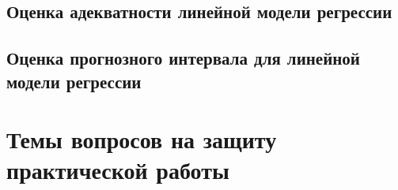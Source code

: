 \documentclass[
]{article}
\begin{document}
\hypertarget{ux43eux446ux435ux43dux43aux430-ux430ux434ux435ux43aux432ux430ux442ux43dux43eux441ux442ux438-ux43bux438ux43dux435ux439ux43dux43eux439-ux43cux43eux434ux435ux43bux438-ux440ux435ux433ux440ux435ux441ux441ux438ux438}{%
\subsection{\texorpdfstring{\textbf{Оценка адекватности линейной модели
регрессии}}{Оценка адекватности линейной модели регрессии}}\label{ux43eux446ux435ux43dux43aux430-ux430ux434ux435ux43aux432ux430ux442ux43dux43eux441ux442ux438-ux43bux438ux43dux435ux439ux43dux43eux439-ux43cux43eux434ux435ux43bux438-ux440ux435ux433ux440ux435ux441ux441ux438ux438}}

\hypertarget{ux43eux446ux435ux43dux43aux430-ux43fux440ux43eux433ux43dux43eux437ux43dux43eux433ux43e-ux438ux43dux442ux435ux440ux432ux430ux43bux430-ux434ux43bux44f-ux43bux438ux43dux435ux439ux43dux43eux439-ux43cux43eux434ux435ux43bux438-ux440ux435ux433ux440ux435ux441ux441ux438ux438}{%
\subsection{\texorpdfstring{\textbf{Оценка прогнозного интервала для
линейной модели
регрессии}}{Оценка прогнозного интервала для линейной модели регрессии}}\label{ux43eux446ux435ux43dux43aux430-ux43fux440ux43eux433ux43dux43eux437ux43dux43eux433ux43e-ux438ux43dux442ux435ux440ux432ux430ux43bux430-ux434ux43bux44f-ux43bux438ux43dux435ux439ux43dux43eux439-ux43cux43eux434ux435ux43bux438-ux440ux435ux433ux440ux435ux441ux441ux438ux438}}

\hypertarget{ux442ux435ux43cux44b-ux432ux43eux43fux440ux43eux441ux43eux432-ux43dux430-ux437ux430ux449ux438ux442ux443-ux43fux440ux430ux43aux442ux438ux447ux435ux441ux43aux43eux439-ux440ux430ux431ux43eux442ux44b}{%
\section{\texorpdfstring{\textbf{Темы вопросов на защиту практической
работы}}{Темы вопросов на защиту практической работы}}\label{ux442ux435ux43cux44b-ux432ux43eux43fux440ux43eux441ux43eux432-ux43dux430-ux437ux430ux449ux438ux442ux443-ux43fux440ux430ux43aux442ux438ux447ux435ux441ux43aux43eux439-ux440ux430ux431ux43eux442ux44b}}
\end{document}
